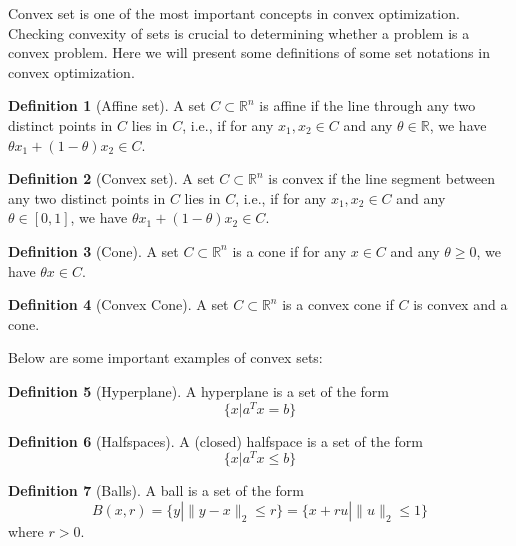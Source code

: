 \documentclass[
]{book}
\theoremstyle{definition}
\newtheorem{definition}{Definition}[chapter]
\theoremstyle{definition}
\theoremstyle{definition}
\theoremstyle{definition}
\theoremstyle{remark}
\begin{document}
Convex set is one of the most important concepts in convex optimization. Checking convexity of sets is crucial to determining whether a problem is a convex problem. Here we will present some definitions of some set notations in convex optimization.

\begin{definition}[Affine set]
\protect\hypertarget{def:affineset}{}\label{def:affineset}A set \(C\subset \mathbb{R}^n\) is affine if the line through any two distinct points in \(C\) lies in \(C\), i.e., if for any \(x_1,x_2 \in C\) and any \(\theta \in \mathbb{R}\), we have \(\theta x_1 + (1-\theta)x_2 \in C\).
\end{definition}

\begin{definition}[Convex set]
\protect\hypertarget{def:convexset}{}\label{def:convexset}A set \(C\subset \mathbb{R}^n\) is convex if the line segment between any two distinct points in \(C\) lies in \(C\), i.e., if for any \(x_1,x_2 \in C\) and any \(\theta \in [0,1]\), we have \(\theta x_1 + (1-\theta)x_2 \in C\).
\end{definition}

\begin{definition}[Cone]
\protect\hypertarget{def:cone}{}\label{def:cone}A set \(C\subset \mathbb{R}^n\) is a cone if for any \(x\in C\) and any \(\theta\geq 0\), we have \(\theta x \in C\).
\end{definition}

\begin{definition}[Convex Cone]
\protect\hypertarget{def:convexcone}{}\label{def:convexcone}A set \(C\subset \mathbb{R}^n\) is a convex cone if \(C\) is convex and a cone.
\end{definition}

Below are some important examples of convex sets:

\begin{definition}[Hyperplane]
\protect\hypertarget{def:hyperplane}{}\label{def:hyperplane}A hyperplane is a set of the form \[\{x|a^Tx = b\}\]
\end{definition}

\begin{definition}[Halfspaces]
\protect\hypertarget{def:halfspaces}{}\label{def:halfspaces}A (closed) halfspace is a set of the form \[\{x|a^Tx \leq b\}\]
\end{definition}

\begin{definition}[Balls]
\protect\hypertarget{def:balls}{}\label{def:balls}A ball is a set of the form \[B(x,r) = \{y|\|y-x\|_2 \leq r\} = \{x+ru|\|u\|_2\leq 1\}\]
where \(r >0\).
\end{definition}
\end{document}
